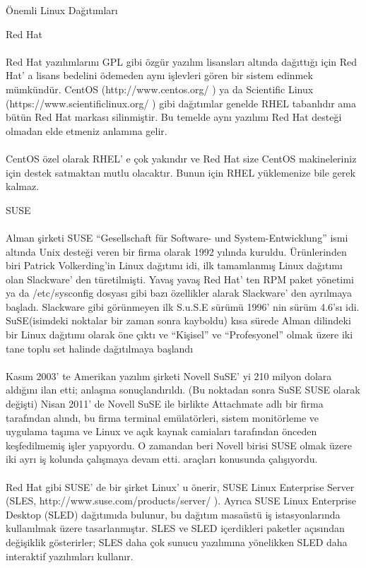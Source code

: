 \documentclass[10pt,a5paper]{book}
\begin{document}
\begin{section}{Önemli Linux Dağıtımları}
\begin{subsection}{Red Hat}
\paragraph{}{Red Hat yazılımlarını GPL gibi özgür yazılım lisansları altında dağıttığı için Red Hat' a lisans bedelini ödemeden aynı işlevleri gören bir sistem edinmek mümkündür. CentOS (http://www.centos.org/ ) ya da Scientific Linux (https://www.scientificlinux.org/ ) gibi dağıtımlar genelde RHEL tabanlıdır ama bütün Red Hat markası silinmiştir. Bu temelde aynı yazılımı Red Hat desteği olmadan elde etmeniz anlamına gelir.}
\paragraph{}{CentOS özel olarak RHEL' e çok yakındır ve Red Hat size CentOS makineleriniz için destek satmaktan mutlu olacaktır. Bunun için RHEL yüklemenize bile gerek kalmaz.}
\end{subsection}
\begin{subsection}{SUSE}
\paragraph{}{Alman şirketi SUSE “Gesellschaft für Software- und System-Entwicklung” ismi altında Unix desteği veren bir firma olarak 1992 yılında kuruldu. Ürünlerinden biri Patrick Volkerding’in Linux dağıtımı idi, ilk tamamlanmış Linux dağıtımı olan Slackware' den türetilmişti. Yavaş yavaş Red Hat' ten RPM paket yönetimi ya da /etc/sysconfig dosyası gibi bazı özellikler alarak Slackware' den ayrılmaya başladı. Slackware gibi görünmeyen ilk S.u.S.E sürümü 1996' nin sürüm 4.6'sı idi. SuSE(isimdeki noktalar bir zaman sonra kayboldu) kısa sürede Alman dilindeki bir Linux dağıtımı olarak öne çıktı ve “Kişisel” ve “Profesyonel” olmak üzere iki tane toplu set halinde dağıtılmaya başlandı}
\paragraph{}{Kasım 2003' te Amerikan yazılım şirketi Novell SuSE' yi 210 milyon dolara aldığını ilan etti; anlaşma sonuçlandırıldı. (Bu noktadan sonra SuSE SUSE olarak değişti) Nisan 2011' de Novell SuSE ile birlikte Attachmate adlı bir firma tarafından alındı, bu firma terminal emülatörleri, sistem monitörleme ve uygulama taşıma ve Linux ve açık kaynak camiaları tarafından önceden keşfedilmemiş işler yapıyordu. O zamandan beri Novell birisi SUSE olmak üzere iki ayrı iş kolunda çalışmaya devam etti. araçları konusunda çalışıyordu.}
\paragraph{}{Red Hat gibi SUSE' de bir şirket Linux' u önerir, SUSE Linux Enterprise Server (SLES, http://www.suse.com/products/server/ ). Ayrıca SUSE Linux Enterprise Desktop (SLED) dağıtımıda bulunur, bu dağıtım masaüstü iş istasyonlarında kullanılmak üzere tasarlanmıştır. SLES ve SLED içerdikleri paketler açısından değişiklik gösterirler; SLES daha çok sunucu yazılımına yönelikken SLED daha interaktif yazılımları kullanır.}

\end{subsection}
\end{section}
\end{document}
